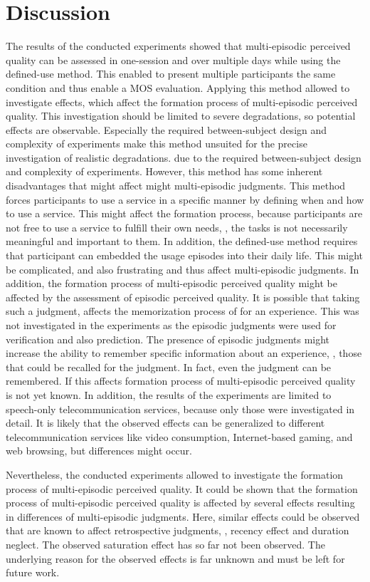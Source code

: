 \section{Discussion}
The results of the conducted experiments showed that multi-episodic perceived quality can be assessed in one-session and over multiple days while using the defined-use method.
This enabled to present multiple participants the same condition and thus enable a \ac{MOS} evaluation.
Applying this method allowed to investigate effects, which affect the formation process of multi-episodic perceived quality.
This investigation should be limited to severe degradations, so potential effects are observable.
Especially the required between-subject design and complexity of experiments make this method unsuited for the precise investigation of realistic degradations.
due to the required between-subject design and complexity of experiments.
However, this method has some inherent disadvantages that might affect might multi-episodic judgments.
This method forces participants to use a service in a specific manner by defining when and how to use a service.
This might affect the formation process, because participants are not free to use a service to fulfill their own needs, \ie, the tasks is not necessarily meaningful and important to them.
In addition, the defined-use method requires that participant can embedded the usage episodes into their daily life.
This might be complicated, and also frustrating and thus affect multi-episodic judgments.
In addition, the formation process of multi-episodic perceived quality might be affected by the assessment of episodic perceived quality.
It is possible that taking such a judgment, affects the memorization process of for an experience.
This was not investigated in the experiments as the episodic judgments were used for verification and also prediction.
The presence of episodic judgments might increase the ability to remember specific information about an experience, \ie, those that could be recalled for the judgment.
In fact, even the judgment can be remembered.
If this affects formation process of multi-episodic perceived quality is not yet known.
In addition, the results of the experiments are limited to speech-only telecommunication services, because only those were investigated in detail.
It is likely that the observed effects can be generalized to different telecommunication services like video consumption, Internet-based gaming, and web browsing, but differences might occur.

Nevertheless, the conducted experiments allowed to investigate the formation process of multi-episodic perceived quality.
It could be shown that the formation process of multi-episodic perceived quality is affected by several effects resulting in differences of multi-episodic judgments.
Here, similar effects could be observed that are known to affect retrospective judgments, \ie, recency effect and duration neglect.
The observed saturation effect has so far not been observed.
The underlying reason for the observed effects is far unknown and must be left for future work.


